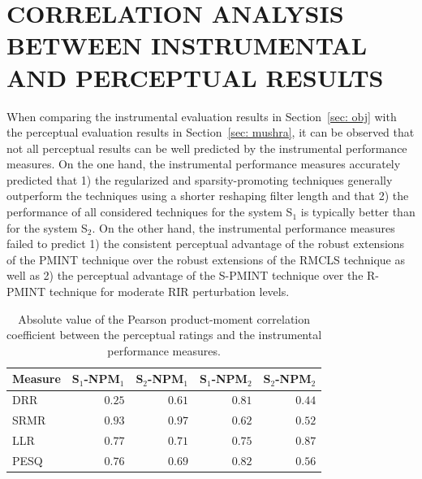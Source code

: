 \documentclass[fleqn]{aes2e}
\begin{document}
\section{CORRELATION ANALYSIS BETWEEN INSTRUMENTAL AND PERCEPTUAL RESULTS}
\label{sec: corrs}
When comparing the instrumental evaluation results in Section~\ref{sec: obj} with the perceptual evaluation results in Section~\ref{sec: mushra}, it can be observed that not all perceptual results can be well predicted by the instrumental performance measures. 
On the one hand, the instrumental performance measures accurately predicted that 1) the regularized and sparsity-promoting techniques generally outperform the techniques using a shorter reshaping filter length and that 2) the performance of all considered techniques for the system S$_1$ is typically better than for the system S$_2$. 
On the other hand, the instrumental performance measures failed to predict 1) the consistent perceptual advantage of the robust extensions of the PMINT technique over the robust extensions of the RMCLS technique as well as 2) the perceptual advantage of the S-PMINT technique over the R-PMINT technique for moderate RIR perturbation levels.
\begin{table}[b!]  \small
\begin{center}
  \caption{Absolute value of the Pearson product-moment correlation coefficient between the perceptual ratings and the instrumental performance measures.}
  \label{tbl: corr}
  \begin{tabularx}{\linewidth}{Xrrrr} 
    \toprule 
    Measure & S$_1$-NPM$_1$ & S$_2$-NPM$_1$ & S$_1$-NPM$_2$ & S$_2$-NPM$_2$ \\
    \midrule 
    DRR & $0.25$ & $0.61$ & $0.81$ & $0.44$ \\
    SRMR & $\mathbf{0.93}$  & $\mathbf{0.97}$ & $0.62$ & $0.52$ \\
    LLR & $0.77$ & $0.71$ & $0.75$ & $\mathbf{0.87}$ \\
    PESQ & $0.76$ & $0.69$ & $\mathbf{0.82}$ & $0.56$ \\
    \bottomrule
  \end{tabularx}
\end{center}
\end{table}
\end{document}
